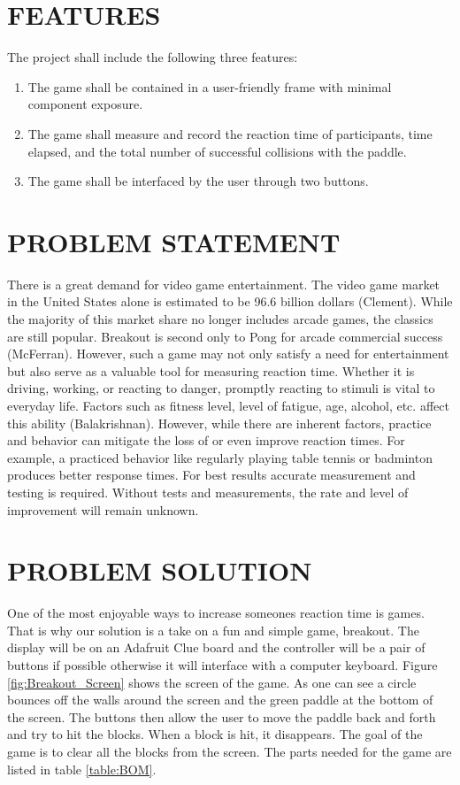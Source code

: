 \documentclass[12pt]{article}
\begin{document}
\section{FEATURES}
The project shall include the following three features:

\begin{enumerate}
  \item The game shall be contained in a user-friendly frame with minimal component exposure.
  \item The game shall measure and record the reaction time of participants, time elapsed, and the total number of successful collisions with the paddle.
  \item The game shall be interfaced by the user through two buttons.
\end{enumerate}


\section{PROBLEM STATEMENT}

There is a great demand for video game entertainment. The video game market in the United States alone is estimated to be 96.6 billion dollars (Clement). While the majority of this market 
share no longer includes arcade games, the classics are still popular. Breakout is second only to Pong for arcade commercial success (McFerran). However, such a game may not 
only satisfy a need for entertainment but also serve as a valuable tool for measuring reaction time. Whether it is driving, working, or reacting to danger, promptly reacting 
to stimuli is vital to everyday life. Factors such as fitness level, level of fatigue, age, alcohol, etc. affect this ability (Balakrishnan).  However, while there are inherent 
factors, practice and behavior can mitigate the loss of or even improve reaction times. For example, a practiced behavior like regularly playing table tennis or badminton 
produces better response times. For best results accurate measurement and testing is required. Without tests and measurements, the rate and level of improvement will remain unknown.


\section{PROBLEM SOLUTION}
One of the most enjoyable ways to increase someones reaction time is games. That is why our solution is a take on a fun and simple game, breakout. The display will be on an Adafruit Clue board and the controller will be a pair of buttons if possible otherwise it will interface with a computer keyboard. Figure \ref{fig:Breakout_Screen} shows the screen of the game. As one can see a circle bounces off the walls around the screen and the green paddle at the bottom of the screen. The buttons then allow the user to move the paddle back and forth and try to hit the blocks. When a block is hit, it disappears. The goal of the game is to clear all the blocks from the screen. The parts needed for the game are listed in table \ref{table:BOM}.
\end{document}
